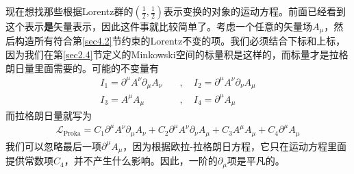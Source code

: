 现在想找那些根据Lorentz群的$(\frac{1}{2},\frac{1}{2})$表示变换的对象的运动方程。前面已经看到这个表示{\bfseries 是}矢量表示，因此这件事就比较简单了。考虑一个任意的矢量场$A_\mu$，然后构造所有符合第\ref{sec4.2}节约束的Lorentz不变的项。我们必须结合下标和上标，因为我们在第\ref{sec2.4}节定义的Minkowski空间的标量积是这样的，而标量才是拉格朗日量里面需要的。可能的不变量有
\[\begin{split}
I_1=\partial^\mu A^\nu\partial_\mu A_\nu\quad &,\quad I_2=\partial^\mu A^\nu\partial_\nu A_\mu\\
I_3=A^\mu A_\mu\quad &,\quad I_4=\partial^\mu A_\mu
\end{split}\]
而拉格朗日量就写为
\begin{align}\label{equ6.19}
\mathscr{L}_{\text{Proka}} = C_1\partial^\mu A^\nu\partial_\mu A_\nu+C_2\partial^\mu A^\nu\partial_\nu A_\mu+C_3A^\mu A_\mu+C_4\partial^\mu A_\mu
\end{align}
我们可以忽略最后一项$\partial^\mu A_\mu$，因为根据欧拉-拉格朗日方程，它只在运动方程里面提供常数项$C_4$，并不产生什么影响。因此，一阶的$\partial_\mu$项是平凡的。

